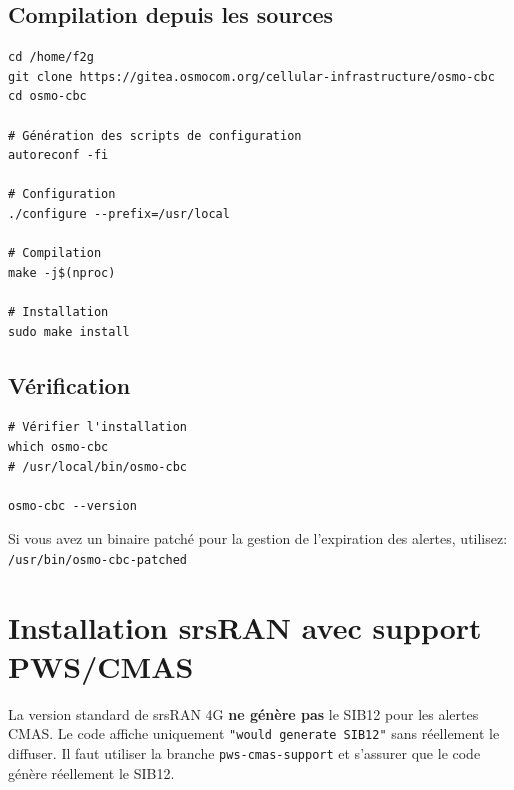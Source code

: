 \documentclass[11pt,a4paper]{article}
\begin{document}
\subsection{Compilation depuis les sources}

\begin{cmdbox}
\begin{lstlisting}[style=bashstyle]
cd /home/f2g
git clone https://gitea.osmocom.org/cellular-infrastructure/osmo-cbc
cd osmo-cbc

# Génération des scripts de configuration
autoreconf -fi

# Configuration
./configure --prefix=/usr/local

# Compilation
make -j$(nproc)

# Installation
sudo make install
\end{lstlisting}
\end{cmdbox}

\subsection{Vérification}

\begin{successbox}
\begin{lstlisting}[style=bashstyle]
# Vérifier l'installation
which osmo-cbc
# /usr/local/bin/osmo-cbc

osmo-cbc --version
\end{lstlisting}
\end{successbox}

\begin{warnbox}
Si vous avez un binaire patché pour la gestion de l'expiration des alertes, utilisez:
\texttt{/usr/bin/osmo-cbc-patched}
\end{warnbox}

\newpage

\section{Installation srsRAN avec support PWS/CMAS}

\begin{errorbox}
La version standard de srsRAN 4G \textbf{ne génère pas} le SIB12 pour les alertes CMAS. Le code affiche uniquement \texttt{"would generate SIB12"} sans réellement le diffuser. Il faut utiliser la branche \texttt{pws-cmas-support} et s'assurer que le code génère réellement le SIB12.
\end{errorbox}
\end{document}
